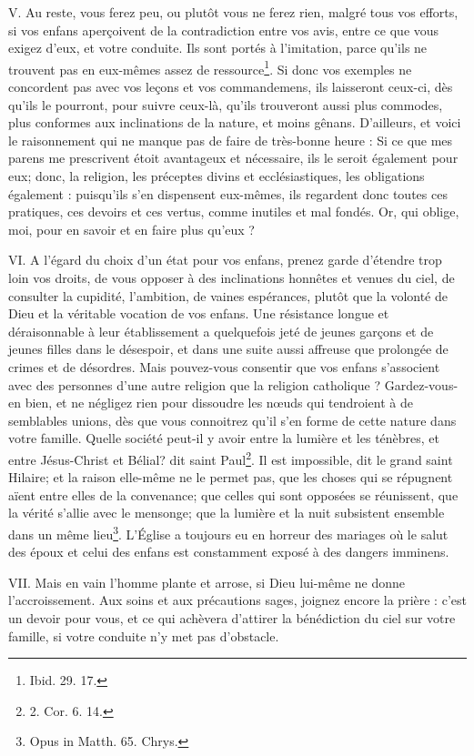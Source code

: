 \documentclass[instructions.tex]{subfiles}
\begin{document}
V. Au reste, vous ferez peu, ou plutôt vous ne ferez rien, malgré tous vos efforts, si vos enfans aperçoivent de la contradiction entre vos avis, entre ce que vous exigez d’eux, et votre conduite. Ils sont portés à l’imitation, parce qu’ils ne trouvent pas en eux-mêmes assez de ressource\footnote{Ibid. 29. 17.}. Si donc vos exemples ne concordent pas avec vos leçons et vos commandemens, ils laisseront ceux-ci, dès qu’ils le pourront, pour suivre ceux-là, qu’ils trouveront aussi plus commodes, plus conformes aux inclinations de la nature, et moins gênans. D’ailleurs, et voici le raisonnement qui ne manque pas de faire de très-bonne heure : Si ce que mes parens me prescrivent étoit avantageux et nécessaire, ils le seroit également pour eux; donc, la religion, les préceptes divins et ecclésiastiques, les obligations également : puisqu’ils s’en dispensent eux-mêmes, ils regardent donc toutes ces pratiques, ces devoirs et ces vertus, comme inutiles et mal fondés. Or, qui oblige, moi, pour en savoir et en faire plus qu’eux ?
 
VI. A l’égard du choix d’un état pour vos enfans, prenez garde d’étendre trop loin vos droits, de vous opposer à des inclinations honnêtes et venues du ciel, de consulter la cupidité, l’ambition, de vaines espérances, plutôt que la volonté de Dieu et la véritable vocation de vos enfans. Une résistance longue et déraisonnable à leur établissement a quelquefois jeté de jeunes garçons et de jeunes filles dans le désespoir, et dans une suite aussi affreuse que prolongée de crimes et de désordres. Mais pouvez-vous consentir que vos enfans s’associent avec des personnes d’une autre religion que la religion catholique ? Gardez-vous-en bien, et ne négligez rien pour dissoudre les nœuds qui tendroient à de semblables unions, dès que vous connoitrez qu’il s’en forme de cette nature dans votre famille. Quelle société peut-il y avoir entre la lumière et les ténèbres, et entre Jésus-Christ et Bélial? dit saint Paul\footnote{2. Cor. 6. 14.}. Il est impossible, dit le grand saint Hilaire; et la raison elle-même ne le permet pas, que les choses qui se répugnent aïent entre elles de la convenance; que celles qui sont opposées se réunissent, que la vérité s’allie avec le mensonge; que la lumière et la nuit subsistent ensemble dans un même lieu\footnote{Opus in Matth. 65. Chrys.}. L’Église a toujours eu en horreur des mariages où le salut des époux et celui des enfans est constamment exposé à des dangers imminens.
 
VII. Mais en vain l’homme plante et arrose, si Dieu lui-même ne donne l’accroissement. Aux soins et aux précautions sages, joignez encore la prière : c’est un devoir pour vous, et ce qui achèvera d’attirer la bénédiction du ciel sur votre famille, si votre conduite n’y met pas d’obstacle.
 
\end{document}
